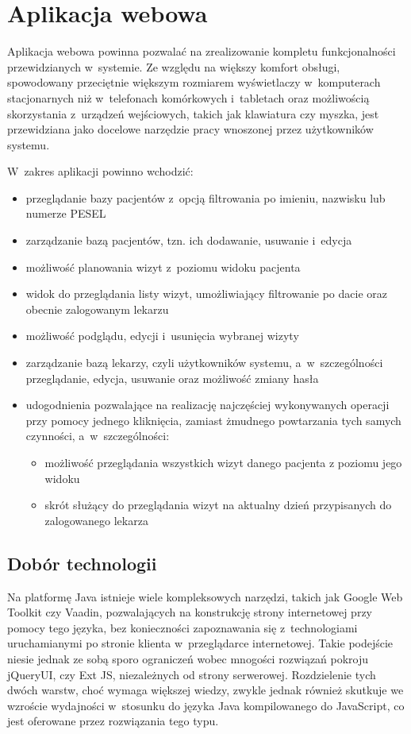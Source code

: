 \documentclass[11pt]{aghdpl}
\begin{document}
\section{Aplikacja webowa}

Aplikacja webowa powinna pozwalać na zrealizowanie kompletu funkcjonalności przewidzianych w~systemie. Ze względu na większy komfort obsługi, spowodowany przeciętnie większym rozmiarem wyświetlaczy w~komputerach stacjonarnych niż w~telefonach komórkowych i~tabletach oraz możliwością skorzystania z~urządzeń wejściowych, takich jak klawiatura czy myszka, jest przewidziana jako docelowe narzędzie pracy wnoszonej przez użytkowników systemu.

W~zakres aplikacji powinno wchodzić:
\begin{itemize}
	\item przeglądanie bazy pacjentów z~opcją filtrowania po imieniu, nazwisku lub numerze PESEL
	\item zarządzanie bazą pacjentów, tzn. ich dodawanie, usuwanie i~edycja
	\item możliwość planowania wizyt z~poziomu widoku pacjenta
	\item widok do przeglądania listy wizyt, umożliwiający filtrowanie po dacie oraz obecnie zalogowanym lekarzu
	\item możliwość podglądu, edycji i~usunięcia wybranej wizyty
	\item zarządzanie bazą lekarzy, czyli użytkowników systemu, a~w~szczególności przeglądanie, edycja, usuwanie oraz możliwość zmiany hasła
	\item udogodnienia pozwalające na realizację najczęściej wykonywanych operacji przy pomocy jednego kliknięcia, zamiast żmudnego powtarzania tych samych czynności, a~w~szczególności:
	\begin{itemize}
		\item możliwość przeglądania wszystkich wizyt danego pacjenta z poziomu jego widoku
		\item skrót służący do przeglądania wizyt na aktualny dzień przypisanych do zalogowanego lekarza
	\end{itemize} 
\end{itemize}

\subsection{Dobór technologii}

Na platformę Java istnieje wiele kompleksowych narzędzi, takich jak Google Web Toolkit czy Vaadin, pozwalających na konstrukcję strony internetowej przy pomocy tego języka, bez konieczności zapoznawania się z~technologiami uruchamianymi po stronie klienta w~przeglądarce internetowej. Takie podejście niesie jednak ze sobą sporo ograniczeń wobec mnogości rozwiązań pokroju jQueryUI, czy Ext JS, niezależnych od strony serwerowej. Rozdzielenie tych dwóch warstw, choć wymaga większej wiedzy, zwykle jednak również skutkuje we wzroście wydajności w~stosunku do języka Java kompilowanego do JavaScript, co jest oferowane przez rozwiązania tego typu.
\end{document}
